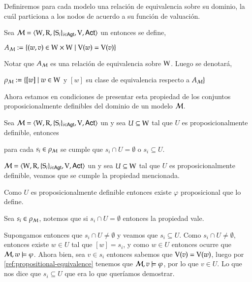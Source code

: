 Definiremos para cada modelo una relación de equivalencia sobre su dominio, la cuál particiona a los nodos de acuerdo
a su función de valuación.

\begin{definicion}\label{def:A_m}
    Sea $\mathcal{M}=\langle \mathrm{W},\mathrm{R},\{ \mathrm{S}_i \}_{i \in {\rm \sf Agt}},\mathrm{V},{\rm \sf Act} \rangle$ un \ults entonces se define, 
    \begin{center}
        $A_{\mathcal{M}} := \{(w,v) \in \mathrm{W} \times \mathrm{W} \mid \mathrm{V}(w) = \mathrm{V}(v)\}$
    \end{center}
    Notar que $A_{\mathcal{M}}$ es una relación de equivalencia sobre $\mathrm{W}$. Luego se denotará,
    \begin{center}
        $\rho_{\mathcal{M}} := \{ [w] \mid w \in \mathrm{W} $ y $[w]$ su clase de equivalencia respecto a $A_{\mathcal{M}}\}$
    \end{center}
\end{definicion}

Ahora estamos en condiciones de presentar esta propiedad de los conjuntos proposicionalmente definibles del dominio de un modelo $\mathcal{M}$.

\begin{lema}\label{ref:propositionally-definable-lemma}
    Sea $\mathcal{M}=\langle \mathrm{W},\mathrm{R},\{ \mathrm{S}_i \}_{i \in {\rm \sf Agt}},\mathrm{V},{\rm \sf Act} \rangle$ un \ults y sea $U \subseteq \mathrm{W}$ tal que $U$ es proposicionalmente definible, entonces
    \begin{center}
        para cada $s_i \in \rho_{\mathcal{M}}$ se cumple que $s_i \cap U = \emptyset$ o $s_i \subseteq U$.
    \end{center}
\end{lema}

\begin{demostracion}
    $\mathcal{M}=\langle \mathrm{W},\mathrm{R},\{ \mathrm{S}_i \}_{i \in {\rm \sf Agt}},\mathrm{V},{\rm \sf Act} \rangle$ un \ults y sea $U \subseteq \mathrm{W}$ tal que $U$ es proposicionalmente definible, 
    veamos que se cumple la propiedad mencionada.

    Como $U$ es proposicionalmente definible entonces existe $\varphi$ proposicional que lo define.

    Sea $s_i \in \rho_{\mathcal{M}}$, notemos que si $s_i \cap U = \emptyset$ entonces la propiedad vale.
    
    Supongamos entonces que $s_i \cap U \neq \emptyset$ y veamos que $s_i \subseteq U$. Como $s_i \cap U \neq \emptyset$, entonces existe 
    $w \in U$ tal que $[w] = s_i$, y como $w \in U$ entonces ocurre que $\mathcal{M},w \models \varphi$. Ahora bien, sea $v \in s_i$ 
    entonces sabemos que $\mathrm{V}(v) = \mathrm{V}(w)$, luego por \ref{ref:propositional-equivalence} tenemos que $\mathcal{M},v \models \varphi$, por 
    lo que $v \in U$. Lo que nos dice que $s_i \subseteq U$ que era lo que queríamos demostrar.  
\end{demostracion}

